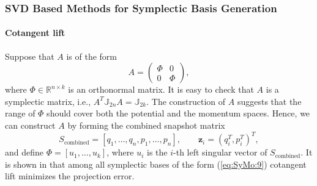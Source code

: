 \subsubsection{SVD Based Methods for Symplectic Basis Generation} \label{chap:SyMo.PrSy:2} 


\paragraph{\bf Cotangent lift} Suppose that $A$ is of the form
\begin{equation} \label{eq:SyMo:9}
	A = 
	\begin{pmatrix}
		\Phi & 0 \\
		0 & \Phi
	\end{pmatrix},
\end{equation}
where $\Phi \in \mathbb{R}^{n\times k}$ is an orthonormal matrix. It is easy to check that $A$ is a symplectic matrix, i.e., $A^T \mathbb J_{2n} A = \mathbb J_{2k}$. The construction of $A$ suggests that the range of $\Phi$ should cover both the potential and the momentum spaces. Hence, we can construct $A$ by forming the combined snapshot matrix
\begin{equation} \label{eq:SyMo:10}
	S_{\text{combined}} = [q_1,\dots,q_n,p_1,\dots,p_n], \qquad \mathbf z_i = (q_i^T,p_i^T)^T,
\end{equation}
and define $\Phi=[u_1,\dots,u_k]$, where $u_i$ is the $i$-th left singular vector of $S_{\text{combined}}$. It is shown in \cite{Peng:2014di} that among all symplectic bases of the form (\ref{eq:SyMo:9}) cotangent lift minimizes the projection error.


%
%

